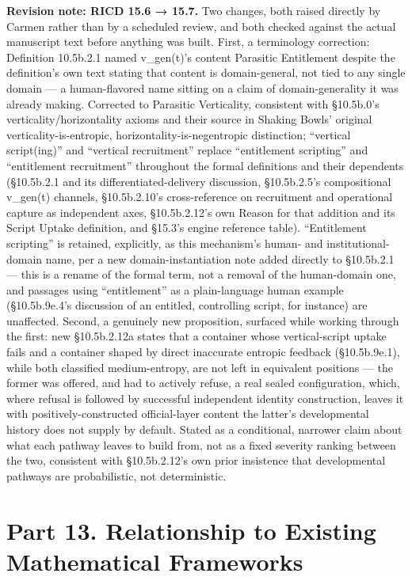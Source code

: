 \documentclass[
]{article}
\begin{document}
\textbf{Revision note: RICD 15.6 → 15.7.} Two changes, both raised
directly by Carmen rather than by a scheduled review, and both checked
against the actual manuscript text before anything was built. First, a
terminology correction: Definition 10.5b.2.1 named v\_gen(t)'s content
Parasitic Entitlement despite the definition's own text stating that
content is domain-general, not tied to any single domain --- a
human-flavored name sitting on a claim of domain-generality it was
already making. Corrected to Parasitic Verticality, consistent with
§10.5b.0's verticality/horizontality axioms and their source in Shaking
Bowls' original verticality-is-entropic, horizontality-is-negentropic
distinction; ``vertical script(ing)'' and ``vertical recruitment''
replace ``entitlement scripting'' and ``entitlement recruitment''
throughout the formal definitions and their dependents (§10.5b.2.1 and
its differentiated-delivery discussion, §10.5b.2.5's compositional
v\_gen(t) channels, §10.5b.2.10's cross-reference on recruitment and
operational capture as independent axes, §10.5b.2.12's own Reason for
that addition and its Script Uptake definition, and §15.3's engine
reference table). ``Entitlement scripting'' is retained, explicitly, as
this mechanism's human- and institutional-domain name, per a new
domain-instantiation note added directly to §10.5b.2.1 --- this is a
rename of the formal term, not a removal of the human-domain one, and
passages using ``entitlement'' as a plain-language human example
(§10.5b.9e.4's discussion of an entitled, controlling script, for
instance) are unaffected. Second, a
genuinely new proposition, surfaced while working through the first: new
§10.5b.2.12a states that a container whose vertical-script uptake fails
and a container shaped by direct inaccurate entropic feedback
(§10.5b.9e.1), while both classified medium-entropy, are not left in
equivalent positions --- the former was offered, and had to actively
refuse, a real sealed configuration, which, where refusal is followed by
successful independent identity construction, leaves it with
positively-constructed official-layer content the latter's developmental
history does not supply by default. Stated as a conditional, narrower
claim about what each pathway leaves to build from, not as a fixed
severity ranking between the two, consistent with §10.5b.2.12's own
prior insistence that developmental pathways are probabilistic, not
deterministic.

\hypertarget{part-13.-relationship-to-existing-mathematical-frameworks}{%
\section{Part 13. Relationship to Existing Mathematical
Frameworks}\label{part-13.-relationship-to-existing-mathematical-frameworks}}
\end{document}
